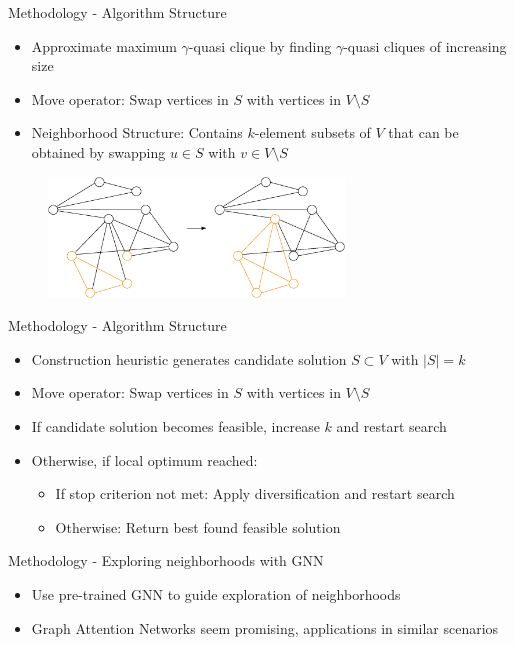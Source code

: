 \documentclass{beamer}
\begin{document}
\begin{frame}{Methodology - Algorithm Structure}
    \begin{itemize}
        \item Approximate maximum $\gamma$-quasi clique by finding $\gamma$-quasi cliques of increasing size
        \item Move operator: Swap vertices in $S$ with vertices in $V \setminus S$
        \item Neighborhood Structure: Contains $k$-element subsets of $V$ that can be obtained by swapping $u \in S$ with $v \in V \setminus S$
    \end{itemize}
    
\begin{figure}
    \centering
    \includegraphics[width=0.7\textwidth]{graphics/graph-after-swap.eps}
\end{figure}
\end{frame}

\begin{frame}{Methodology - Algorithm Structure}
    \begin{itemize}
        \item<1-> Construction heuristic generates candidate solution $S \subset V$ with $|S| = k$
        \item<2-> Move operator: Swap vertices in $S$ with vertices in $V \setminus S$
        \item<3-> If candidate solution becomes feasible, increase $k$ and restart search
        \item<4-> Otherwise, if local optimum reached:
        \begin{itemize}
            \item If stop criterion not met: Apply diversification and restart search
            \item Otherwise: Return best found feasible solution
        \end{itemize}
    \end{itemize}
\end{frame}

\begin{frame}{Methodology - Exploring neighborhoods with GNN}
    \begin{itemize}
        \item<1-> Use pre-trained GNN to guide exploration of neighborhoods
        \item<2-> Graph Attention Networks \cite{Velickovic2018} seem promising, applications in similar scenarios
        
    \end{itemize}
\end{frame}
        
\end{document}
